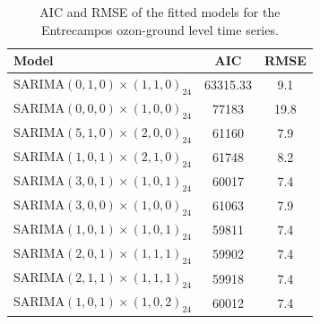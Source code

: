\documentclass{article}
\begin{document}
\begin{table}
    \centering
    \begin{tabular}{|l|c|c|}
    \toprule
    \textbf{Model} & \textbf{AIC} & \textbf{RMSE} \\
    \midrule 
    SARIMA$(0,1,0) \times (1,1,0)_{24}$ & 63315.33 & 9.1  \\
    SARIMA$(0,0,0) \times (1,0,0)_{24}$ & 77183 & 19.8   \\
    SARIMA$(5,1,0) \times (2,0,0)_{24}$ & 61160 & 7.9  \\
    SARIMA$(1,0,1) \times (2,1,0)_{24}$ & 61748 & 8.2   \\
    SARIMA$(3,0,1) \times (1,0,1)_{24}$ & 60017 & 7.4  \\
    SARIMA$(3,0,0) \times (1,0,0)_{24}$ & 61063 & 7.9   \\
    SARIMA$(1,0,1) \times (1,0,1)_{24}$ & 59811 & 7.4  \\
    SARIMA$(2,0,1) \times (1,1,1)_{24}$ & 59902 & 7.4  \\
    SARIMA$(2,1,1) \times (1,1,1)_{24}$ & 59918 & 7.4  \\
    SARIMA$(1,0,1) \times (1,0,2)_{24}$ & 60012 & 7.4  \\
    \bottomrule
    \end{tabular}
    \caption{AIC and RMSE of the fitted models for the Entrecampos ozon-ground level time series.}
    \label{tab:Entrecampos}
\end{table}


\newpage
\end{document}
